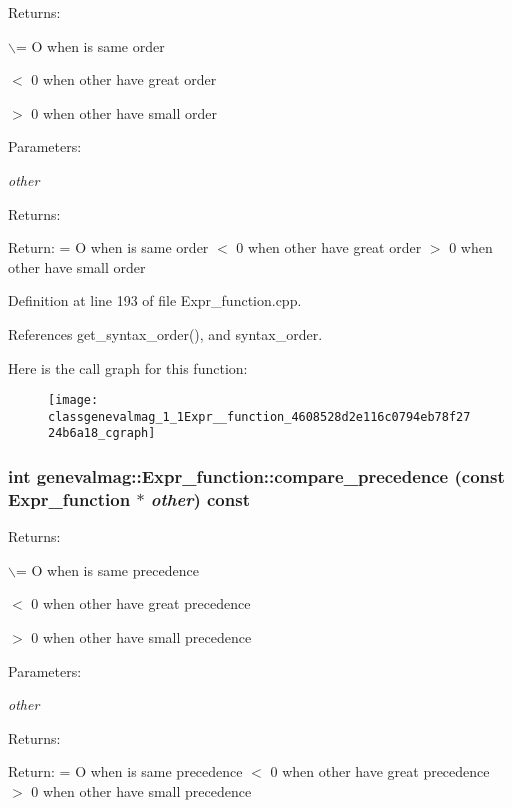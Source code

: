 Returns:\par
 $\backslash$= O when is same order\par
 $<$ 0 when other have great order\par
 $>$ 0 when other have small order\par
 \begin{Desc}
\item[Parameters:]
\begin{description}
\item[{\em other}]\end{description}
\end{Desc}
\begin{Desc}
\item[Returns:]\end{Desc}
Return: = O when is same order $<$ 0 when other have great order $>$ 0 when other have small order 

Definition at line 193 of file Expr\_\-function.cpp.

References get\_\-syntax\_\-order(), and syntax\_\-order.

Here is the call graph for this function:\nopagebreak
\begin{figure}[H]
\begin{center}
\leavevmode
\texttt{[image: classgenevalmag\_1\_1Expr\_\_function\_4608528d2e116c0794eb78f2724b6a18\_cgraph]}
\end{center}
\end{figure}
\hypertarget{classgenevalmag_1_1Expr__function_83c21a4b327d045d8da159d6079dd99c}{
\subsubsection[{compare\_\-precedence}]{\setlength{\rightskip}{0pt plus 5cm}int genevalmag::Expr\_\-function::compare\_\-precedence (const {\bf Expr\_\-function} $\ast$ {\em other}) const}}
\label{classgenevalmag_1_1Expr__function_83c21a4b327d045d8da159d6079dd99c}


Returns:\par
 $\backslash$= O when is same precedence\par
 $<$ 0 when other have great precedence\par
 $>$ 0 when other have small precedence\par
 \begin{Desc}
\item[Parameters:]
\begin{description}
\item[{\em other}]\end{description}
\end{Desc}
\begin{Desc}
\item[Returns:]\end{Desc}
Return: = O when is same precedence $<$ 0 when other have great precedence $>$ 0 when other have small precedence 

